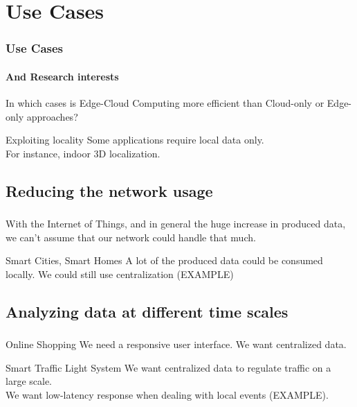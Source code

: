 \documentclass[utf8,xcolor=table, page number]{earlywinter}
\begin{document}
\section{Use Cases}

\begin{frame}
  \frametitle{Use Cases}
  \framesubtitle{And Research interests}

  \begin{block}{}
    In which cases is Edge-Cloud Computing more efficient than Cloud-only or Edge-only approaches?
  \end{block}

  \begin{exampleblock}{Exploiting locality}
    Some applications require local data only.\\
    For instance, indoor 3D localization.
  \end{exampleblock}
  
\end{frame}



\subsection{Reducing the network usage}
\begin{frame}
  \frametitle{\secname}
  \framesubtitle{\subsecname}

  With the Internet of Things, and in general the huge increase in produced data, we can't assume that our network could handle that much.

  \begin{exampleblock}{Smart Cities, Smart Homes}
    A lot of the produced data could be consumed locally. We could still use centralization (EXAMPLE)
  \end{exampleblock}
  
\end{frame}


\subsection{Analyzing data at different time scales}
\begin{frame}
  \frametitle{\secname}
  \framesubtitle{\subsecname}

  \begin{exampleblock}{Online Shopping}
    We need a responsive user interface. We want centralized data.
  \end{exampleblock}

  \begin{exampleblock}{Smart Traffic Light System}
    We want centralized data to regulate traffic on a large scale.\\
    We want low-latency response when dealing with local events (EXAMPLE).
  \end{exampleblock}
  
\end{frame}
\end{document}
